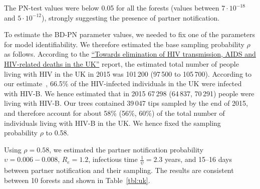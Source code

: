 \documentclass[10pt,letterpaper]{article}
\begin{document}
The PN-test values were below 0.05 for all the forests (values between $7 \cdot 10^{-18}$ and $5 \cdot 10^{-12}$), strongly suggesting the presence of partner notification.

To estimate the BD-PN parameter values, we needed to fix one of the parameters for model identifiability. We therefore estimated the base sampling probability $\rho$ as follows. According to the \href{https://webarchive.nationalarchives.gov.uk/ukgwa/20181112132123mp_/https://assets.publishing.service.gov.uk/government/uploads/system/uploads/attachment_data/file/602942/HIV_in_the_UK_report.pdf}{``Towards elimination of HIV transmission, AIDS and HIV-related deaths in the UK''}
 report, the estimated total number of people living with HIV in the UK in 2015 was 101\,200 (97\,500 to 105\,700). %
According to our estimate~\cite{zhukovaModelingDrugResistance2023}, 66.5\% of the HIV-infected individuals in the UK were infected with HIV-B. We hence estimated that in 2015 67\,298 (64\,837, 70\,291) people were living with HIV-B. Our trees contained 39\,047 tips sampled by the end of 2015, and therefore account for about 58\% (56\%, 60\%) of the total number of individuals living with HIV-B in the UK. We hence fixed the sampling probability $\rho$ to 0.58. %
 
 
Using $\rho=0.58$, we estimated the partner notification probability $\upsilon=0.006-0.008$, %
$R_e = 1.2$, infectious time $\frac{1}{\psi} = 2.3$ years, and 15--16 days between partner notification and their sampling. The results are consistent between 10 forests and shown in Table~\ref{tbl:uk}. %
 
\end{document}
